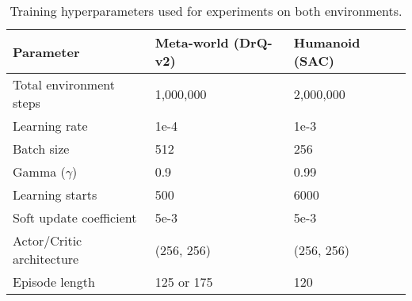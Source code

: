 \begin{table}[h]
\centering
\caption{Training hyperparameters used for experiments on both environments.}\label{tab_hyperp}
\begin{tabular}{lll}
\toprule
\textbf{Parameter} & \textbf{Meta-world (DrQ-v2)} & \textbf{Humanoid (SAC)} \\
\midrule
Total environment steps   & 1,000,000            & 2,000,000      \\
Learning rate             & 1e-4   & 1e-3 \\
Batch size                & 512                 & 256 \\
Gamma ($\gamma$)          & 0.9                & 0.99           \\
Learning starts           & 500                & 6000          \\
Soft update coefficient   & 5e-3  & 5e-3 \\
Actor/Critic architecture & (256, 256)         & (256, 256)    \\
Episode length            & 125 or 175         & 120            \\
\bottomrule
\end{tabular}
\end{table}


